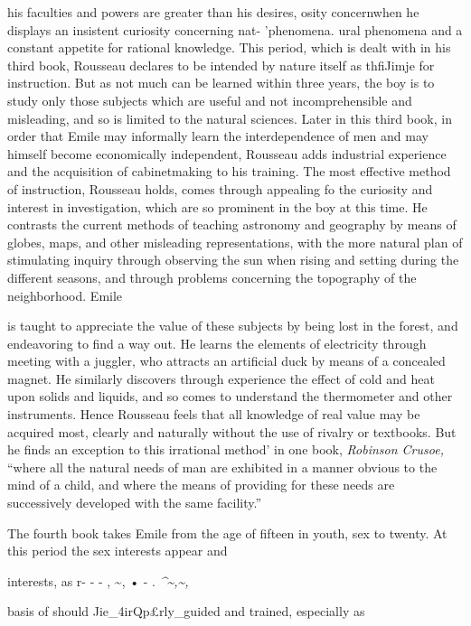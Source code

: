 \documentclass[
]{book}
\begin{document}
his faculties and powers are greater than his desires, osity concernwhen he displays an insistent curiosity concerning nat- 'phenomena. ural phenomena and a constant appetite for rational knowledge. This period, which is dealt with in his third book, Rousseau declares to be intended by nature itself as thfiJimje for instruction. But as not much can be learned within three years, the boy is to study only those subjects which are useful and not incomprehensible and misleading, and so is limited to the natural sciences. Later in this third book, in order that Emile may informally learn the interdependence of men and may himself become economically independent, Rousseau adds industrial experience and the acquisition of cabinetmaking to his training. The most effective method of instruction, Rousseau holds, comes through appealing fo the curiosity and interest in investigation, which are so prominent in the boy at this time. He contrasts the current methods of teaching astronomy and geography by means of globes, maps, and other misleading representations, with the more natural plan of stimulating inquiry through observing the sun when rising and setting during the different seasons, and through problems concerning the topography of the neighborhood. Emile

is taught to appreciate the value of these subjects by being lost in the forest, and endeavoring to find a way out. He learns the elements of electricity through meeting with a juggler, who attracts an artificial duck by means of a concealed magnet. He similarly discovers through experience the effect of cold and heat upon solids and liquids, and so comes to understand the thermometer and other instruments. Hence Rousseau feels that all knowledge of real value may be acquired most, clearly and naturally without the use of rivalry or textbooks. But he finds an exception to this irrational method' in one book, \emph{Robinson Crusoe,} ``where all the natural needs of man are exhibited in a manner obvious to the mind of a child, and where the means of providing for these needs are successively developed with the same facility.''

The fourth book takes Emile from the age of fifteen in youth, sex to twenty. At this period the sex interests appear and

interests, as r- - - , \textasciitilde, • - . \emph{\^{}\textasciitilde,\textasciitilde,}

basis of should Jie\_4irQp£rly\_guided and trained, especially as
\end{document}

